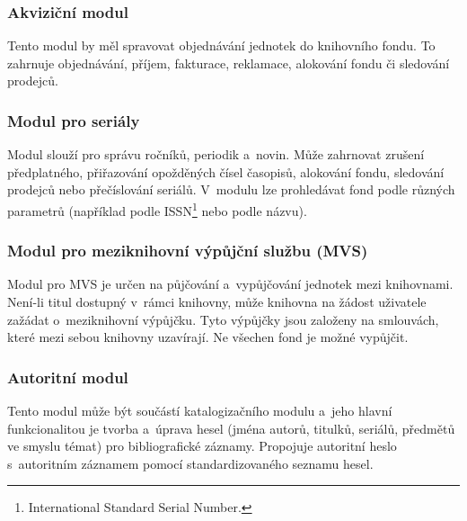 \documentclass[
	11pt, oneside, printed, final, palatino
	microtype,
	table,   %
	lof,     %
	lot     %
]{fithesis3}
\begin{document}
{\subsubsection{{\large Akviziční modul}}
Tento modul by měl spravovat objednávání jednotek do knihovního fondu. To zahrnuje objednávání, příjem, fakturace, reklamace, alokování fondu či sledování prodejců. 

\subsubsection{{\large Modul pro seriály}}
Modul slouží pro správu ročníků, periodik a~novin. Může zahrnovat zrušení předplatného, přiřazování opožděných čísel časopisů, alokování fondu, sledování prodejců nebo přečíslování seriálů. V~modulu lze prohledávat fond podle různých parametrů (například podle ISSN\footnote{International Standard Serial Number.} nebo podle názvu).

\subsubsection{{\large Modul pro meziknihovní výpůjční službu (MVS)}}
Modul pro MVS je určen na půjčování a~vypůjčování jednotek mezi knihovnami. Není-li titul dostupný v~rámci knihovny, může knihovna na žádost uživatele zažádat o~meziknihovní výpůjčku. Tyto výpůjčky jsou založeny na smlouvách, které mezi sebou knihovny uzavírají. Ne všechen fond je možné vypůjčit.

\subsubsection{{\large Autoritní modul}}
Tento modul může být součástí katalogizačního modulu a~jeho hlavní funkcionalitou je tvorba a~úprava hesel (jména autorů, titulků, seriálů, předmětů ve smyslu témat) pro bibliografické záznamy. Propojuje autoritní heslo s~autoritním záznamem pomocí standardizovaného seznamu hesel.

}
\end{document}
